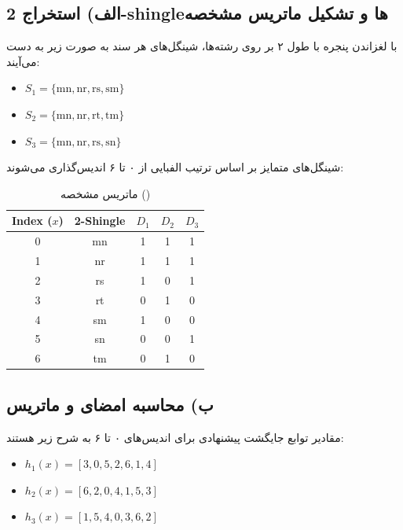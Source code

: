 \documentclass[11pt,a4paper]{article}
\begin{document}
	\subsection{الف) استخراج 2-shingleها و تشکیل ماتریس مشخصه}
	با لغزاندن پنجره با طول ۲ بر روی رشته‌ها، شینگل‌های هر سند به صورت زیر به دست می‌آیند:
	\begin{itemize}
		\item $S_1 = \{\text{mn}, \text{nr}, \text{rs}, \text{sm}\}$
		\item $S_2 = \{\text{mn}, \text{nr}, \text{rt}, \text{tm}\}$
		\item $S_3 = \{\text{mn}, \text{nr}, \text{rs}, \text{sn}\}$
	\end{itemize}
	
	شینگل‌های متمایز بر اساس ترتیب الفبایی از ۰ تا ۶ اندیس‌گذاری می‌شوند:
	\begin{center}
		\small
		\colorbox{cardBg}{}
	\end{center}
	
	\begin{table}[H]
		\centering
		\small
		\renewcommand{\arraystretch}{1.30}
		\caption{ماتریس مشخصه ()}
		\vspace{0.15cm}
		\begin{latin}
			\begin{tabular}{ccccc}
				\toprule
				\rowcolor{headerBg}
				\textbf{Index ($x$)} & \textbf{2-Shingle} & $D_1$ & $D_2$ & $D_3$ \\
				\midrule
				0 & mn & 1 & 1 & 1 \\
				1 & nr & 1 & 1 & 1 \\
				2 & rs & 1 & 0 & 1 \\
				3 & rt & 0 & 1 & 0 \\
				4 & sm & 1 & 0 & 0 \\
				5 & sn & 0 & 0 & 1 \\
				6 & tm & 0 & 1 & 0 \\
				\bottomrule
			\end{tabular}
		\end{latin}
	\end{table}
	
	\subsection{ب) محاسبه امضای  و ماتریس }
	مقادیر توابع جایگشت پیشنهادی برای اندیس‌های ۰ تا ۶ به شرح زیر هستند:
	\begin{itemize}
		\item $h_1(x) = [3, 0, 5, 2, 6, 1, 4]$
		\item $h_2(x) = [6, 2, 0, 4, 1, 5, 3]$
		\item $h_3(x) = [1, 5, 4, 0, 3, 6, 2]$
	\end{itemize}
	
\end{document}
